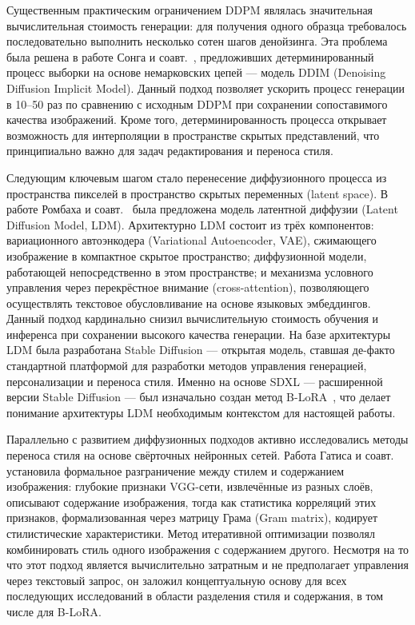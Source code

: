Существенным практическим ограничением DDPM являлась значительная вычислительная стоимость генерации: для получения одного образца требовалось последовательно выполнить несколько сотен шагов денойзинга. Эта проблема была решена в работе Сонга и соавт.~\cite{song2021ddim}, предложивших детерминированный процесс выборки на основе немарковских цепей --- модель DDIM (Denoising Diffusion Implicit Model). Данный подход позволяет ускорить процесс генерации в 10--50 раз по сравнению с исходным DDPM при сохранении сопоставимого качества изображений. Кроме того, детерминированность процесса открывает возможность для интерполяции в пространстве скрытых представлений, что принципиально важно для задач редактирования и переноса стиля.

Следующим ключевым шагом стало перенесение диффузионного процесса из пространства пикселей в пространство скрытых переменных (latent space). В работе Ромбаха и соавт.~\cite{rombach2022ldm} была предложена модель латентной диффузии (Latent Diffusion Model, LDM). Архитектурно LDM состоит из трёх компонентов: вариационного автоэнкодера (Variational Autoencoder, VAE), сжимающего изображение в компактное скрытое пространство; диффузионной модели, работающей непосредственно в этом пространстве; и механизма условного управления через перекрёстное внимание (cross-attention), позволяющего осуществлять текстовое обусловливание на основе языковых эмбеддингов. Данный подход кардинально снизил вычислительную стоимость обучения и инференса при сохранении высокого качества генерации. На базе архитектуры LDM была разработана Stable Diffusion --- открытая модель, ставшая де-факто стандартной платформой для разработки методов управления генерацией, персонализации и переноса стиля. Именно на основе SDXL --- расширенной версии Stable Diffusion --- был изначально создан метод B-LoRA~\cite{frenkel2024blora}, что делает понимание архитектуры LDM необходимым контекстом для настоящей работы.

Параллельно с развитием диффузионных подходов активно исследовались методы переноса стиля на основе свёрточных нейронных сетей. Работа Гатиса и соавт.~\cite{gatys2016nst} установила формальное разграничение между стилем и содержанием изображения: глубокие признаки VGG-сети, извлечённые из разных слоёв, описывают содержание изображения, тогда как статистика корреляций этих признаков, формализованная через матрицу Грама (Gram matrix), кодирует стилистические характеристики. Метод итеративной оптимизации позволял комбинировать стиль одного изображения с содержанием другого. Несмотря на то что этот подход является вычислительно затратным и не предполагает управления через текстовый запрос, он заложил концептуальную основу для всех последующих исследований в области разделения стиля и содержания, в том числе для B-LoRA.


